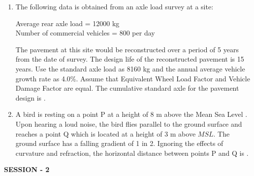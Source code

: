 \documentclass[journal,12pt,onecolumn]{article}
\theoremstyle{remark}
\begin{document}
\begin{enumerate}
    \hfill{}
    
    \item The following data is obtained from an axle load survey at a site:
    
    Average rear axle load = 12000 kg\\
    Number of commercial vehicles = 800 per day
    
    The pavement at this site would be reconstructed over a period of 5 years from the date of survey. The design life of the reconstructed pavement is 15 years. Use the standard axle load as 8160 kg and the annual average vehicle growth rate as 4.0\%. Assume that Equivalent Wheel Load Factor  and Vehicle Damage Factor  are equal.
    The cumulative standard axle  for the pavement design is \underline{\hspace{2cm}} .
    
    \hfill{}
    
    \item A bird is resting on a point P at a height of 8 m above the Mean Sea Level . Upon hearing a loud noise, the bird flies parallel to the ground surface and reaches a point Q which is located at a height of 3 m above $MSL$. The ground surface has a falling gradient of 1 in 2. Ignoring the effects of curvature and refraction, the horizontal distance  between points P and Q is \underline{\hspace{2cm}} .
    
    \hfill{}

\end{enumerate}

\textbf{SESSION - 2}
\end{document}
